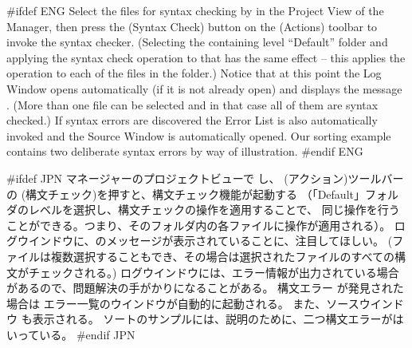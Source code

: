 \documentclass[\pformat,12pt]{article}
\newcommand{\guicmd}[1]{{\sf #1}}
\newcommand{\guicmd}[1]{{\gt #1}}
\begin{document}
#ifdef ENG
Select the files for syntax checking by
 in the \guicmd{Project View}
of the \guicmd{Manager}, then press the 
(\guicmd{Syntax Check}) button on the (\guicmd{Actions})
toolbar to invoke the syntax checker. (Selecting the containing level
 ``Default'' folder and applying the syntax check operation to that
 has the same effect -- this applies the operation to each of the
 files in the folder.) Notice that at this point the
\guicmd{Log Window} opens automatically (if it is not already open)
and displays the message 
.
(More than one file can be selected and
  in that case all of them are syntax checked.) If syntax
  errors are discovered the \guicmd{Error List} is
also au\-to\-matically invoked and the \guicmd{Source Window} is
automatically opened. Our sorting example contains two
deliberate syntax errors by way of illustration.
#endif ENG

#ifdef JPN
\guicmd{マネージャー}の\guicmd{プロジェクトビュー}で
し、 
(\guicmd{アクション})ツールバーの  
(\guicmd{構文チェック})を押すと、構文チェック機能が起動する
（「Default」フォルダのレベルを選択し、構文チェックの操作を適用することで、
同じ操作を行うことができる。つまり、そのフォルダ内の各ファイルに操作が適用される）。
\guicmd{ログウインドウ}に、のメッセージが表示されていることに、注目してほしい。
(ファイルは複数選択することもでき、その場合は選択されたファイルのすべての構文がチェックされる。)
\guicmd{ログウインドウ}には、エラー情報が出力されている場合があるので、問題解決の手がかりになることがある。
構文エラー が発見された場合は
\guicmd{エラー一覧}のウインドウが自動的に起動される。
また、\guicmd{ソースウインドウ} も表示される。
ソートのサンプルには、説明のために、二つ構文エラーがはいっている。
#endif JPN
\end{document}

